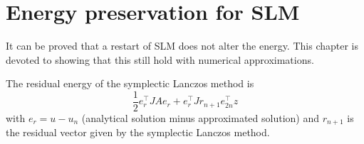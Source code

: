 \chapter{Energy preservation for SLM }
It can be proved that a restart of SLM does not alter the energy. This chapter is devoted to showing that this still hold with numerical approximations.

The residual energy of the symplectic Lanczos method is
\begin{equation}
\frac{1}{2} e_r^{\top} J A e_r + e_r^\top J r_{n+1} e_{2n}^\top z
\end{equation}
with $ e_r = u-u_n $ (analytical solution minus approximated solution) and $r_{n+1}$ is the residual vector given by the symplectic Lanczos method. 

